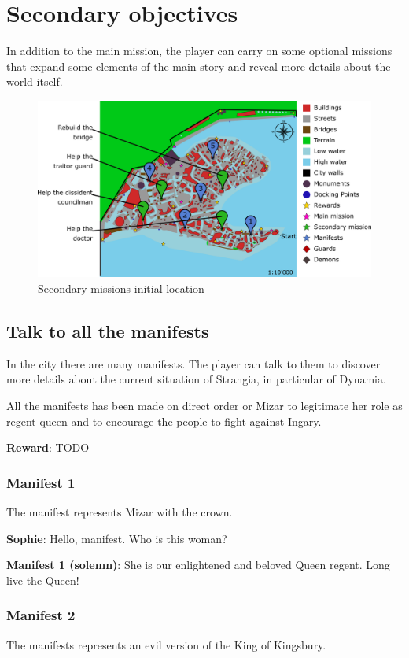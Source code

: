 \section{Secondary objectives}
In addition to the main mission, the player can carry on some optional missions that expand some elements of the main story and reveal more details about the world itself.

\begin{figure}[H]
  \centering
  \includegraphics[width=\textwidth]{../Images/Maps/dynamiaSecondaryMissions}
  \caption{Secondary missions initial location}
\end{figure}

\subsection{Talk to all the manifests}
In the city there are many manifests. The player can talk to them to discover more details about the current situation of Strangia, in particular of Dynamia.

All the manifests has been made on direct order or Mizar to legitimate her role as regent queen and to encourage the people to fight against Ingary.

\textbf{Reward}: TODO

\subsubsection*{Manifest 1}
The manifest represents Mizar with the crown.

\textbf{Sophie}: Hello, manifest. Who is this woman?

\textbf{Manifest 1 (solemn)}: She is our enlightened and beloved Queen regent. Long live the Queen!

\subsubsection*{Manifest 2}
The manifests represents an evil version of the King of Kingsbury.

